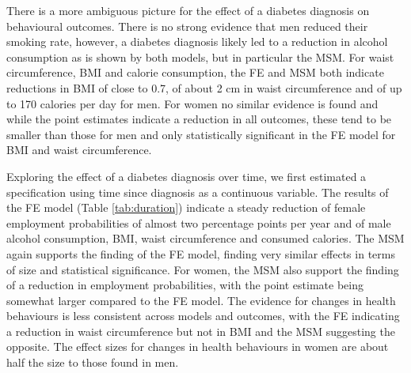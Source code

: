 There is a more ambiguous picture for the effect of a diabetes diagnosis on behavioural outcomes. There is no strong evidence that men reduced their smoking rate, however, a diabetes diagnosis likely led to a reduction in alcohol consumption as is shown by both models, but in particular the \ac{MSM}. For waist circumference, \ac{BMI} and calorie consumption, the \ac{FE} and \ac{MSM} both indicate reductions in \ac{BMI} of close to 0.7, of about 2 cm in waist circumference and of up to 170 calories per day for men. For women no similar evidence is found and while the point estimates indicate a reduction in all outcomes, these tend to be smaller than those for men and only statistically significant in the \ac{FE} model for \ac{BMI} and waist circumference.

Exploring the effect of a diabetes diagnosis over time, we first estimated a specification using time since diagnosis as a continuous variable. The results of the \ac{FE} model (Table \ref{tab:duration}) indicate a steady reduction of female employment probabilities of almost two percentage points per year and of male alcohol consumption, \ac{BMI}, waist circumference and consumed calories. The \ac{MSM} again supports the finding of the \ac{FE} model, finding very similar effects in terms of size and statistical significance. For women, the \ac{MSM} also support the finding of a reduction in employment probabilities, with the point estimate  being somewhat larger compared to the \ac{FE} model. The evidence for changes in health behaviours is less consistent across models and outcomes, with the \ac{FE} indicating a reduction in waist circumference but not in \ac{BMI} and the \ac{MSM} suggesting the opposite. The effect sizes for changes in health behaviours in women are about half the size to those found in men. 

